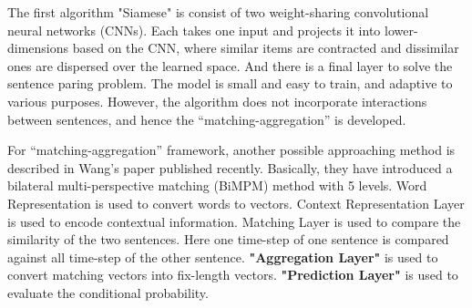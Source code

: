 \documentclass[11pt]{article}
\begin{document}
The first algorithm "Siamese"\cite{erogel} is consist of two weight-sharing convolutional neural networks (CNNs). Each takes one input and projects it into lower-dimensions based on the CNN, where similar items are contracted and dissimilar ones are dispersed over the learned space. And there is a final layer to solve the sentence paring problem. The model is small and easy to train, and adaptive to various purposes. However, the algorithm does not incorporate interactions between sentences, and hence the “matching-aggregation” is developed.

For “matching-aggregation” framework, another possible approaching method is described in Wang's paper published recently.\cite{Wang} Basically, they have introduced a bilateral multi-perspective matching (BiMPM) method with 5 levels. Word Representation is used to convert words to vectors. Context Representation Layer is used to encode contextual information. Matching Layer is used to compare the similarity of the two sentences. Here one time-step of one sentence is compared against all time-step of the other sentence. \textbf{"Aggregation Layer"} is used to convert matching vectors into fix-length vectors. \textbf{"Prediction Layer"} is used to evaluate the conditional probability. 



\end{document}
